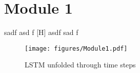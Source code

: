\section{Module 1}
sadf asd f
[H]
asdf sad f



\begin{figure}[H]
	\centering
	\texttt{[image: figures/Module1.pdf]}
	\caption{LSTM unfolded through time steps}
\end{figure}